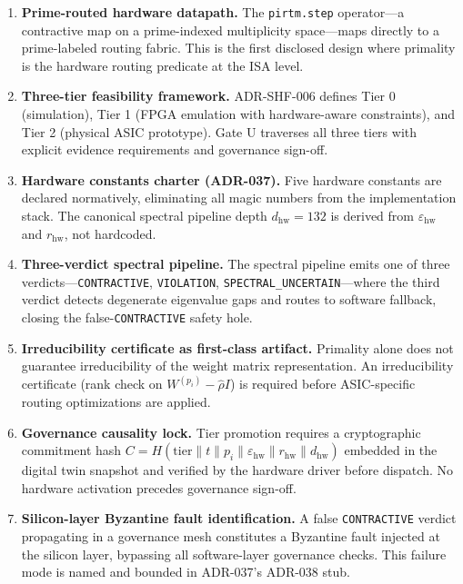 \documentclass[12pt,letterpaper]{article}
\theoremstyle{plain}
\theoremstyle{definition}
\theoremstyle{remark}
\begin{document}
\begin{enumerate}[label=\textbf{C\arabic*.}]
  \item \textbf{Prime-routed hardware datapath.} The \texttt{pirtm.step}
        operator---a contractive map on a prime-indexed multiplicity
        space---maps directly to a prime-labeled routing fabric. This is the
        first disclosed design where primality is the hardware routing predicate
        at the ISA level.

  \item \textbf{Three-tier feasibility framework.} ADR-SHF-006 defines Tier 0
        (simulation), Tier 1 (FPGA emulation with hardware-aware constraints),
        and Tier 2 (physical ASIC prototype). Gate U traverses all three tiers
        with explicit evidence requirements and governance sign-off.

  \item \textbf{Hardware constants charter (ADR-037).} Five hardware constants
        are declared normatively, eliminating all magic numbers from the
        implementation stack. The canonical spectral pipeline depth
        \(d_{\mathrm{hw}} = 132\) is derived from
        \(\varepsilon_{\mathrm{hw}}\) and \(r_{\mathrm{hw}}\), not hardcoded.

  \item \textbf{Three-verdict spectral pipeline.} The spectral pipeline emits
        one of three verdicts---\texttt{CONTRACTIVE}, \texttt{VIOLATION},
        \texttt{SPECTRAL\_UNCERTAIN}---where the third verdict detects
        degenerate eigenvalue gaps and routes to software fallback, closing
        the false-\texttt{CONTRACTIVE} safety hole.

  \item \textbf{Irreducibility certificate as first-class artifact.} Primality
        alone does not guarantee irreducibility of the weight matrix
        representation. An irreducibility certificate (rank check on
        \(W^{(p_i)} - \hat{\rho} I\)) is required before ASIC-specific
        routing optimizations are applied.

  \item \textbf{Governance causality lock.} Tier promotion requires a
        cryptographic commitment hash \(C = H(\text{tier} \| t \| p_i \|
        \varepsilon_{\mathrm{hw}} \| r_{\mathrm{hw}} \| d_{\mathrm{hw}})\)
        embedded in the digital twin snapshot and verified by the hardware
        driver before dispatch. No hardware activation precedes governance sign-off.

  \item \textbf{Silicon-layer Byzantine fault identification.} A false
        \texttt{CONTRACTIVE} verdict propagating in a governance mesh constitutes
        a Byzantine fault injected at the silicon layer, bypassing all
        software-layer governance checks. This failure mode is named and
        bounded in ADR-037's ADR-038 stub.
\end{enumerate}
\end{document}
